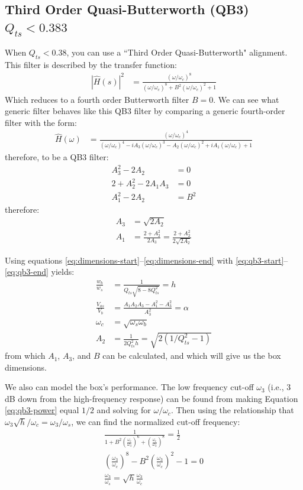 \documentclass[10pt]{book}
\begin{document}
\subsection{Third Order Quasi-Butterworth (QB3) \texorpdfstring{\\$Q_{ts}<0.383$}{Qts<0.383}} When $Q_{ts}<0.38$, you can use a ``Third Order Quasi-Butterworth" alignment. This filter is described by the transfer function:
\begin{align}
\left| \hat{H}(s) \right|^2 &=\frac{(\omega/\omega_c)^8}{(\omega/\omega_c)^8+B^2(\omega/\omega_c)^2+1}
\end{align}
Which reduces to a fourth order Butterworth filter $B=0$. We can see what generic filter behaves like this QB3 filter by comparing a generic fourth-order filter with the form:
\begin{align}
\hat{H}(\omega) &=\frac{(\omega/\omega_c)^4}{(\omega/\omega_c)^4-iA_3(\omega/\omega_c)^3-A_2(\omega/\omega_c)^2+iA_1(\omega/\omega_c)+1}
\end{align}
therefore, to be a QB3 filter:
\begin{align}
A_3^2-2 A_2&=0\label{eq:qb3-start}\\
2+A_2^2-2 A_1 A_3&=0\\
A_1^2-2 A_2&=B^2\label{eq:qb3-end}
\end{align}
therefore:
\begin{align}
A_3&=\sqrt{2 A_2}\\
A_1&=\frac{2+A_2^2}{2 A_3}=\frac{2+A_2^2}{2 \sqrt{2 A_2}}
\end{align}

Using equations \ref{eq:dimensions-start}--\ref{eq:dimensions-end} with \ref{eq:qb3-start}--\ref{eq:qb3-end} yields:
\begin{align}
\frac{w_b}{w_s}&= \frac{1}{Q_{ts}\sqrt{8-8Q_{ts}^2}}=h\\
\frac{V_{as}}{V_{b}} & = \frac{A_1A_2A_3-A_1^2-A_3^2}{A_3^2}= \alpha\\
\omega_c&=\sqrt{\omega_s \omega_b}\\
A_2&=\frac{1}{2 Q_{ts}^2 h}=\sqrt{2(1/Q_{ts}^2-1)}\label{eq:qb3-power}
\end{align}
from which $A_1$, $A_3$, and $B$ can be calculated, and which will give us the box dimensions.

We also can model the box's performance. The low frequency cut-off $\omega_3$ (i.e., 3 dB down from the high-frequency response) can be found from making Equation \ref{eq:qb3-power} equal $1/2$ and solving for $\omega/\omega_c$. Then using the relationship that $\omega_3\sqrt{h}/\omega_c=\omega_3/\omega_s$, we can find the normalized cut-off frequency:
\begin{align}
\frac{1}{1+B^2\left( \frac{\omega_c}{\omega_3} \right)^6+\left( \frac{\omega_c}{\omega_3} \right)^8}=\frac{1}{2}\\
\left( \frac{\omega_3}{\omega_c} \right)^8-B^2\left( \frac{\omega_3}{\omega_c} \right)^2-1=0\\
\frac{\omega_3}{\omega_s}=\sqrt{h}\frac{\omega_3}{\omega_c}
\end{align}
\end{document}
